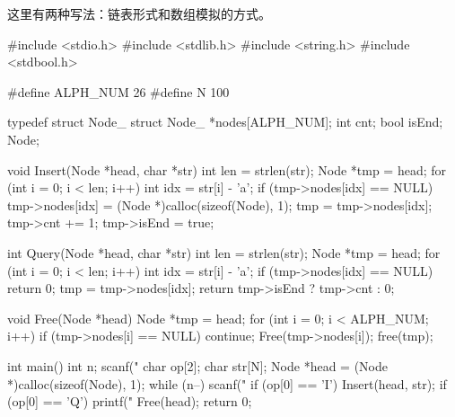 这里有两种写法：链表形式和数组模拟的方式。

\begin{mycpptwocol}[链表形式的Trie]
    #include <stdio.h>
    #include <stdlib.h>
    #include <string.h>
    #include <stdbool.h>

    #define ALPH_NUM 26
    #define N 100

    typedef struct Node_ {
        struct Node_ *nodes[ALPH_NUM];
        int cnt;
        bool isEnd;
    } Node;

    void Insert(Node *head, char *str) {
        int len = strlen(str);
        Node *tmp = head;
        for (int i = 0; i < len; i++) {
            int idx = str[i] - 'a';
            if (tmp->nodes[idx] == NULL) {
                tmp->nodes[idx] = (Node *)calloc(sizeof(Node), 1);
            }
            tmp = tmp->nodes[idx];
        }
        tmp->cnt += 1;
        tmp->isEnd = true;
    }

    int Query(Node *head, char *str) {
        int len = strlen(str);
        Node *tmp = head;
        for (int i = 0; i < len; i++) {
            int idx = str[i] - 'a';
            if (tmp->nodes[idx] == NULL) {
                return 0;
            }
            tmp = tmp->nodes[idx];
        }
        return tmp->isEnd ? tmp->cnt : 0;
    }

    void Free(Node *head) {
        Node *tmp = head;
        for (int i = 0; i < ALPH_NUM; i++) {
            if (tmp->nodes[i] == NULL) {
                continue;
            }
            Free(tmp->nodes[i]);
        }
        free(tmp);
    }

    int main() {
        int n;
        scanf("%
        char op[2];
        char str[N];
        Node *head = (Node *)calloc(sizeof(Node), 1);
        while (n--) {
            scanf("%
            if (op[0] == 'I') {
                Insert(head, str);
            }
            if (op[0] == 'Q') {
                printf("%
            }
        }
        Free(head);
        return 0;
    }
\end{mycpptwocol}

